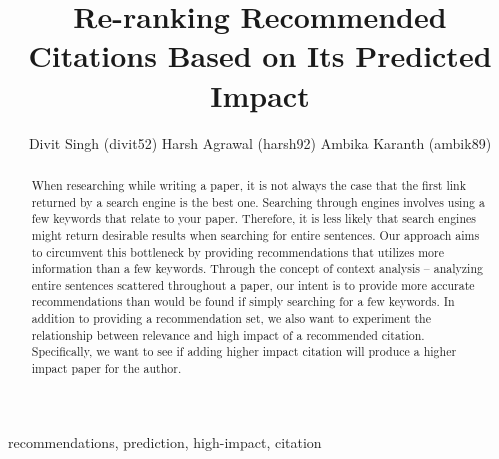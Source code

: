 \documentclass[journal]{IEEEtran}
\begin{document}
\title{Re-ranking Recommended Citations Based on Its Predicted Impact}

\author{Divit Singh (divit52)
        Harsh Agrawal (harsh92)
        Ambika Karanth (ambik89)}%

\maketitle


\begin{abstract}
When researching while writing a paper, it is not always the case that the first link returned by a search engine is the best one.  Searching through engines involves using a few keywords that relate to your paper.  Therefore, it is less likely that search engines might return desirable results when searching for entire sentences. Our approach aims to circumvent this bottleneck by providing recommendations that utilizes more information than a few keywords.   Through the concept of context analysis – analyzing entire sentences scattered throughout a paper, our intent is to provide more accurate recommendations than would be found if simply searching for a few keywords.  In addition to providing a recommendation set, we also want to experiment the relationship between relevance and high impact of a recommended citation.  Specifically, we want to see if adding higher impact citation will produce a higher impact paper for the author.   
\end{abstract}

\begin{IEEEkeywords}
recommendations, prediction, high-impact, citation
\end{IEEEkeywords}






%
\IEEEpeerreviewmaketitle
\end{document}
